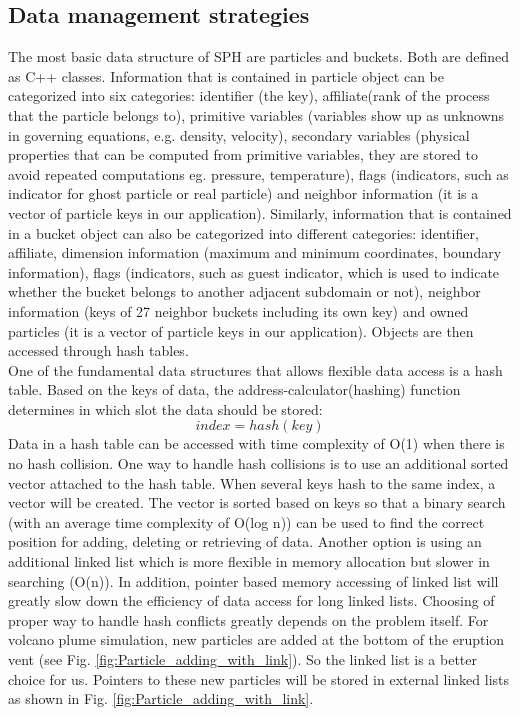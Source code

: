 \documentclass[procedia]{easychair}
\begin{document}
\subsection{Data management strategies}
The most basic data structure of SPH are particles and buckets. Both are defined as C++ classes. Information that is contained in particle object can be categorized into six categories: identifier (the key), affiliate(rank of the process that the particle belongs to), primitive variables (variables show up as unknowns in governing equations, e.g. density, velocity), secondary variables (physical properties that can be computed from primitive variables, they are stored to avoid repeated computations eg. pressure, temperature), flags (indicators, such as indicator for ghost particle or real particle) and neighbor information (it is a vector of particle keys in our application). Similarly,  information that is contained in a bucket object can also be categorized into different categories: identifier, affiliate, dimension information (maximum and minimum coordinates, boundary information), flags (indicators, such as guest indicator, which is used  to indicate whether the bucket belongs to another adjacent subdomain or not), neighbor information (keys of 27 neighbor buckets including its own key) and owned particles (it is a vector of particle keys in our application). Objects are then accessed through hash tables.\\
One of the fundamental data structures that allows flexible data access is a hash table. Based on the keys of data, the address-calculator(hashing) function determines in which slot the data should be stored:
\begin{equation}
index = hash(key)
\end{equation}
Data in a hash table can be accessed with time complexity of O(1) when there is no hash collision. One way to handle hash collisions is to use an additional sorted vector attached to the hash table. When several keys hash to the same index, a vector will be created. The vector is sorted based on keys so that a binary search (with an average time complexity of O(log n)) can be used to find the correct position for adding, deleting or retrieving of data. Another option is using an additional linked list which is more flexible in memory allocation but slower in searching (O(n)). In addition, pointer based memory accessing of linked list will greatly slow down the efficiency of data access for long linked lists. Choosing of proper way to handle hash conflicts greatly depends on the problem itself. For volcano plume simulation, new particles are added at the bottom of the eruption vent (see Fig. \ref{fig:Particle_adding_with_link}). So the linked list is a better choice for us. Pointers to these new particles will be stored in external linked lists as shown in Fig. \ref{fig:Particle_adding_with_link}.
\end{document}
